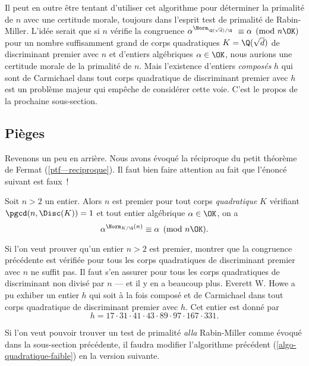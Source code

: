 Il peut en outre être tentant d'utiliser cet algorithme pour déterminer la primalité de $n$ avec une certitude morale, toujours dans l'esprit test de primalité de Rabin-Miller. L'idée serait que si $n$ vérifie la congruence $\alpha^{\Norm_{\Q(\sqrt{d})/\Q}} \equiv \alpha \pmod{n\OK}$ pour un nombre suffisamment grand de corps quadratiques $K = \Q(\sqrt{d})$ de discriminant premier avec $n$ et d'entiers algébriques $\alpha \in \OK$, nous aurions une certitude morale de la primalité de $n$. Mais l'existence d'entiers \emph{composés} $h$ qui sont de Carmichael dans tout corps quadratique de discriminant premier avec $h$ est un problème majeur qui empêche de considérer cette voie. C'est le propos de la prochaine sous-section.

\subsection{Pièges}

Revenons un peu en arrière. Nous avons évoqué la réciproque du petit théorème de Fermat (\ref{ptf—reciproque}). Il faut bien faire attention au fait que l'énoncé suivant est faux~!

\begin{enoncefaux}
	Soit $n>2$ un entier. Alors $n$ est premier \ssi pour tout corps \emph{quadratique} $K$ vérifiant $\pgcd(n, \Disc(K)) = 1$ et tout entier algébrique $\alpha \in \OK$, on a $$\alpha^{\Norm_{K/\Q}(n)} \equiv \alpha \pmod{n\OK}.$$
\end{enoncefaux}

Si l'on veut prouver qu'un entier $n>2$ est premier, montrer que la congruence précédente est vérifiée pour tous les corps quadratiques de discriminant premier avec $n$ ne suffit pas. Il faut s'en assurer pour tous les corps quadratiques de discriminant non divisé par $n$ — et il y en a beaucoup plus. Everett W. Howe a pu exhiber un entier $h$ qui soit à la fois composé et de Carmichael dans tout corps quadratique de discriminant premier avec $h$. Cet entier est donné par $$h = 17 \cdot 31 \cdot 41 \cdot 43 \cdot 89 \cdot 97 \cdot 167 \cdot 331.$$

Si l'on veut pouvoir trouver un test de primalité \emph{alla} Rabin-Miller comme évoqué dans la sous-section précédente, il faudra modifier l'algorithme précédent (\ref{algo-quadratique-faible}) en la version suivante.


